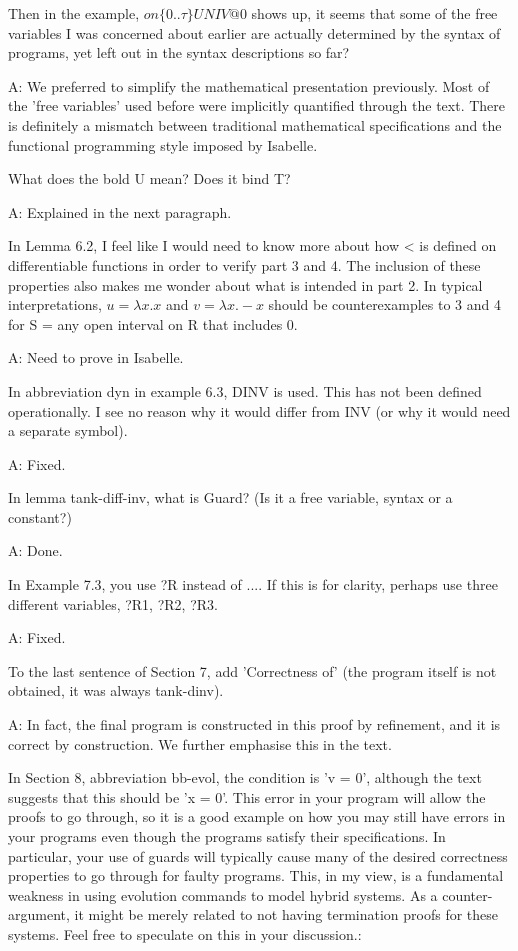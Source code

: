 \documentclass[envcountsame,envcountsect]{llncs}
\begin{document}
Then in the example, $on \{0..\tau\} UNIV @ 0$ shows up, it seems that some of the free variables I was concerned about earlier are actually determined by the syntax of programs, yet left out in the syntax descriptions so far?

A: We preferred to simplify the mathematical presentation previously. Most of the 'free variables' used before were implicitly quantified through the text. There is definitely a mismatch between traditional mathematical specifications and the functional programming style imposed by Isabelle.

What does the bold U mean? Does it bind T?

A: Explained in the next paragraph.

In Lemma 6.2, I feel like I would need to know more about how < is defined on differentiable functions in order to verify part 3 and 4. The inclusion of these properties also makes me wonder about what is intended in part 2. In typical interpretations, $u = \lambda x. x$ and $v = \lambda x. - x$ should be counterexamples to 3 and 4 for S = any open interval on R that includes 0.

A: Need to prove in Isabelle.

In abbreviation dyn in example 6.3, DINV is used. This has not been defined operationally. I see no reason why it would differ from INV (or why it would need a separate symbol). 

A: Fixed.

In lemma tank-diff-inv, what is Guard? (Is it a free variable, syntax or a constant?)

A: Done.

In Example 7.3, you use ?R instead of .... If this is for clarity, perhaps use three different variables, ?R1, ?R2, ?R3.

A: Fixed.

To the last sentence of Section 7, add 'Correctness of' (the program itself is not obtained, it was always tank-dinv).

A: In fact, the final program is constructed in this proof by refinement, and it is correct by construction. We further emphasise this in the text.

In Section 8, abbreviation bb-evol, the condition is 'v = 0', although the text suggests that this should be 'x = 0'. This error in your program will allow the proofs to go through, so it is a good example on how you may still have errors in your programs even though the programs satisfy their specifications. In particular, your use of guards will typically cause many of the desired correctness properties to go through for faulty programs. This, in my view, is a fundamental weakness in using evolution commands to model hybrid systems. As a counter-argument, it might be merely related to not having termination proofs for these systems. Feel free to speculate on this in your discussion.: 
\end{document}
